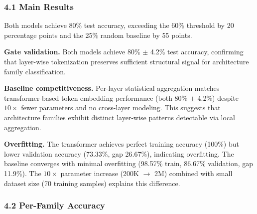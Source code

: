 
\subsubsection{4.1 Main Results}

Both models achieve 80\% test accuracy, exceeding the 60\% threshold by 20 percentage points and the 25\% random baseline by 55 points.

\begin{table}[htbp]
\centering
{}
\end{table}

\textbf{Gate validation.} Both models achieve 80\% $\pm$ 4.2\% test accuracy, confirming that layer-wise tokenization preserves sufficient structural signal for architecture family classification.

\textbf{Baseline competitiveness.} Per-layer statistical aggregation matches transformer-based token embedding performance (both 80\% $\pm$ 4.2\%) despite $10\times$ fewer parameters and no cross-layer modeling. This suggests that architecture families exhibit distinct layer-wise patterns detectable via local aggregation.

\textbf{Overfitting.} The transformer achieves perfect training accuracy (100\%) but lower validation accuracy (73.33\%, gap 26.67\%), indicating overfitting. The baseline converges with minimal overfitting (98.57\% train, 86.67\% validation, gap 11.9\%). The $10\times$ parameter increase (200K $\rightarrow$ 2M) combined with small dataset size (70 training samples) explains this difference.

\subsubsection{4.2 Per-Family Accuracy}

\begin{table}[htbp]
\centering
{}
\end{table}

